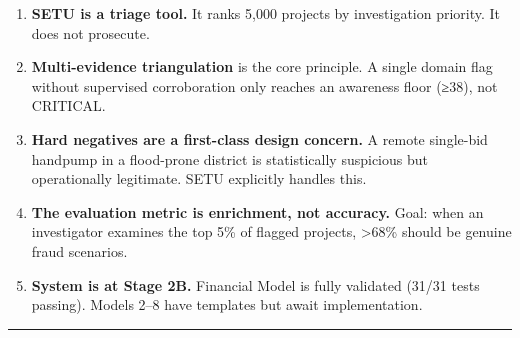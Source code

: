 \documentclass[11pt,a4paper]{article}
\begin{document}
\begin{enumerate}[leftmargin=1.5em, itemsep=2pt, topsep=3pt]
\item \textbf{SETU is a triage tool.} It ranks 5,000 projects by investigation priority. It does not prosecute.
\item \textbf{Multi-evidence triangulation} is the core principle. A single domain flag without supervised corroboration only reaches an awareness floor (≥38), not CRITICAL.
\item \textbf{Hard negatives are a first-class design concern.} A remote single-bid handpump in a flood-prone district is statistically suspicious but operationally legitimate. SETU explicitly handles this.
\item \textbf{The evaluation metric is enrichment, not accuracy.} Goal: when an investigator examines the top 5\% of flagged projects, >68\% should be genuine fraud scenarios.
\item \textbf{System is at Stage 2B.} Financial Model is fully validated (31/31 tests passing). Models 2–8 have templates but await implementation.
\end{enumerate}

\vspace{1em}\hrule\vspace{1em}
\end{document}
